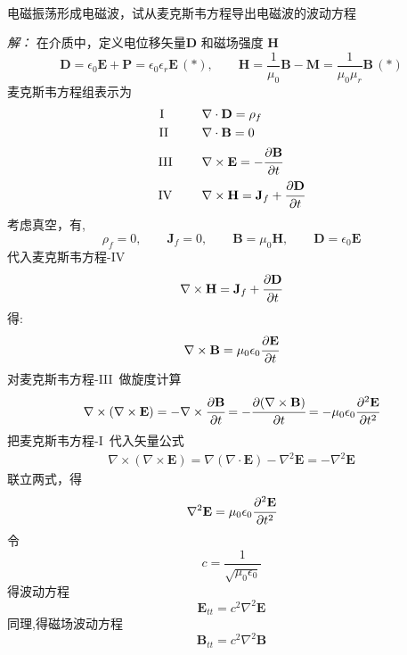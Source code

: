 ~~\\ 
\begin{example}
	电磁振荡形成电磁波，试从麦克斯韦方程导出电磁波的波动方程
\end{example}
\emph{解：}
			在介质中，定义电位移矢量$\mathbf{D}$ 和磁场强度 $\mathbf{H}$
			\[ \mathbf{D}=\epsilon_0 \mathbf{E} + \mathbf{P} = \epsilon_0 \epsilon_r \mathbf{E} \, (*),  \qquad \mathbf{H}=\frac{1}{\mu_0} \mathbf{B} -\mathbf{M}= \frac{1}{\mu_0\mu_r}\mathbf{B} \, (*)\]
			麦克斯韦方程组表示为
			\[ \begin{aligned}
					\text{I}~~~ \hspace*{2em}&\nabla \cdot \mathbf{D} =\rho _f  \\  
					\text{II}~~ \hspace*{2em}&\nabla \cdot \mathbf{B} = 0  \\  
					\text{III}~ \hspace*{2em}&\nabla \times  \mathbf{E} = -\cfrac{\partial \mathbf{B}}{\partial t }  \\  
					\text{IV~}~ \hspace*{1.7em}&\nabla \times  \mathbf{H} = \mathbf{J}_f +  \cfrac{\partial \mathbf{D}}{\partial t } 
				\end{aligned} \]
			考虑真空，有,  
			\[ \rho _f =0, \qquad  \mathbf{J}_f =0 , \qquad  \mathbf{B} = \mu_0 \mathbf{H}, \qquad  \mathbf{D} = \epsilon_0 \mathbf{E} \]
			代入麦克斯韦方程-IV
			 \[ \nabla \times  \mathbf{H} = \mathbf{J}_f +  \cfrac{\partial \mathbf{D}}{\partial t } \]
			得: \[ \nabla \times \mathbf{B} = \mu_0\epsilon_0 \cfrac{\partial \mathbf{E}} {\partial t } \]
			对麦克斯韦方程-III~做旋度计算
			\[    
			\begin{aligned}
			  \nabla \times (\nabla \times  \mathbf{E}) = - \nabla \times \cfrac{\partial \mathbf{B}}{\partial t } = -  \cfrac{\partial (\nabla \times\mathbf{B})}{\partial t } = - \mu_0\epsilon_0  \cfrac{\partial ^2 \mathbf{E}} {\partial t^2 }
			\end{aligned} \]  
			把麦克斯韦方程-I~代入矢量公式
			\[
			\begin{aligned}
				\nabla \times (\nabla \times  \mathbf{E}) =  \nabla (\nabla \cdot  \mathbf{E})- \nabla^2 \mathbf{E} = - \nabla^2 \mathbf{E} 
			\end{aligned} \]
			联立两式，得
			\[
			\nabla^2 \mathbf{E}= \mu_0\epsilon_0 \cfrac{\partial ^2 \mathbf{E}} {\partial t^2 }\]
			令 $$ c =\frac{1}{\sqrt{\mu_0\epsilon_0}} $$
		 	得波动方程
			\[\mathbf{E}_{tt} =c^2\nabla^2 \mathbf{E}\]
			同理,得磁场波动方程
  			\[\mathbf{B}_{tt} =c^2\nabla^2 \mathbf{B}\]
